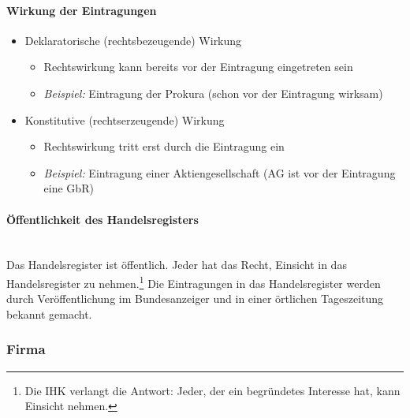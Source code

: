 \paragraph{Wirkung der Eintragungen}
\begin{itemize}
\setlength\itemsep{0em}
	\item Deklaratorische (rechtsbezeugende) Wirkung
	\begin{itemize}
		\item Rechtswirkung kann bereits vor der Eintragung eingetreten sein
		\item {\it Beispiel:} Eintragung der Prokura (schon vor der Eintragung wirksam)
	\end{itemize}
	\item Konstitutive (rechtserzeugende) Wirkung
	\begin{itemize}
		\item Rechtswirkung tritt erst durch die Eintragung ein
		\item {\it Beispiel:} Eintragung einer Aktiengesellschaft (AG ist vor der Eintragung eine GbR)
	\end{itemize}
\end{itemize}

\paragraph{Öffentlichkeit des Handelsregisters}~\\
Das Handelsregister ist öffentlich. Jeder hat das Recht, Einsicht in das Handelsregister zu nehmen.\footnote{Die IHK verlangt die Antwort: \ql Jeder, der ein begründetes Interesse hat, kann Einsicht nehmen.\qr} Die Eintragungen in das Handelsregister werden durch Veröffentlichung im Bundesanzeiger und in einer örtlichen Tageszeitung bekannt gemacht.

\subsubsection{Firma}

